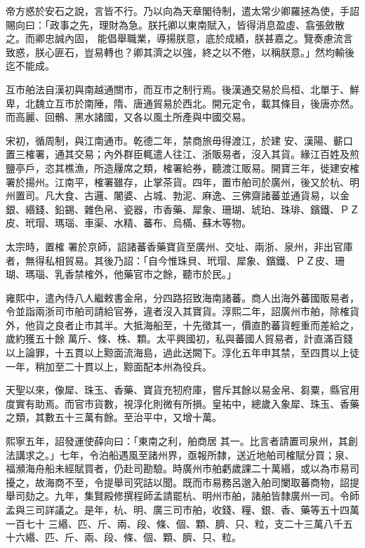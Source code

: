 \begin{pinyinscope}
 帝方惑於安石之說，言皆不行。乃以向為天章閣待制，遣太常少卿羅拯為使，手詔賜向曰：「政事之先，理財為急。朕托卿以東南賦入，皆得消息盈虛、翕張斂散之。而卿忠誠內固，
 能倡舉職業，導揚朕意，底於成績，朕甚嘉之。覽奏慮流言致惑，朕心匪石，豈易轉也？卿其濟之以強，終之以不倦，以稱朕意。」然均輸後迄不能成。



 互市舶法自漢初與南越通關市，而互市之制行焉。後漢通交易於烏桓、北單于、鮮卑，北魏立互市於南陲，隋、唐通貿易於西北。開元定令，載其條目，後唐亦然。而高麗、回鶻、黑水諸國，又各以風土所產與中國交易。



 宋初，循周制，與江南通市。乾德二年，禁商旅毋得渡江，於建
 安、漢陽、蘄口置三榷署，通其交易；內外群臣輒遣人往江、浙販易者，沒入其貨。緣江百姓及煎鹽亭戶，恣其樵漁，所造屨席之類，榷署給券，聽渡江販易。開寶三年，徙建安榷署於揚州。江南平，榷署雖存，止掌茶貨。四年，置市舶司於廣州，後又於杭、明州置司。凡大食、古邏、闍婆、占城、勃泥、麻逸、三佛齋諸蕃並通貨易，以金銀、緡錢、鉛錫、雜色帛、瓷器，市香藥、犀象、珊瑚、琥珀、珠琲、鑌鐵、ＰＺ皮、玳瑁、瑪瑙、車渠、水精、蕃布、烏樠、蘇木等物。



 太宗時，置榷
 署於京師，詔諸蕃香藥寶貨至廣州、交址、兩浙、泉州，非出官庫者，無得私相貿易。其後乃詔：「自今惟珠貝、玳瑁、犀象、鑌鐵、ＰＺ皮、珊瑚、瑪瑙、乳香禁榷外，他藥官市之餘，聽市於民。」



 雍熙中，遣內侍八人繼敕書金帛，分四路招致海南諸蕃。商人出海外蕃國販易者，令並詣兩浙司市舶司請給官券，違者沒入其寶貨。淳熙二年，詔廣州市舶，除榷貨外，他貨之良者止市其半。大抵海船至，十先徵其一，價直酌蕃貨輕重而差給之，歲約獲五十餘
 萬斤、條、株、顆。太平興國初，私與蕃國人貿易者，計直滿百錢以上論罪，十五貫以上黥面流海島，過此送闕下。淳化五年申其禁，至四貫以上徒一年，稍加至二十貫以上，黥面配本州為役兵。



 天聖以來，像犀、珠玉、香藥、寶貨充牣府庫，嘗斥其餘以易金帛、芻粟，縣官用度實有助焉。而官市貨數，視淳化則微有所損。皇祐中，總歲入象犀、珠玉、香藥之類，其數五十三萬有餘。至治平中，又增十萬。



 熙寧五年，詔發運使薛向曰：「東南之利，舶商居
 其一。比言者請置司泉州，其創法講求之。」七年，令泊船遇風至諸州界，亟報所隸，送近地舶司榷賦分買；泉、福瀕海舟船未經賦買者，仍赴司勘驗。時廣州市舶虧歲課二十萬緡，或以為市易司擾之，故海商不至，令提舉司究詰以聞。既而市易務呂邈入舶司闌取蕃商物，詔提舉司劾之。九年，集賢殿修撰程師孟請罷杭、明州市舶，諸舶皆隸廣州一司。令師孟與三司詳議之。是年，杭、明、廣三司市舶，收錢、糧、銀、香、藥等五十四萬一百七十
 三緡、匹、斤、兩、段、條、個、顆、臍、只、粒，支二十三萬八千五十六緡、匹、斤、兩、段、條、個、顆、臍、只、粒。




\end{pinyinscope}
